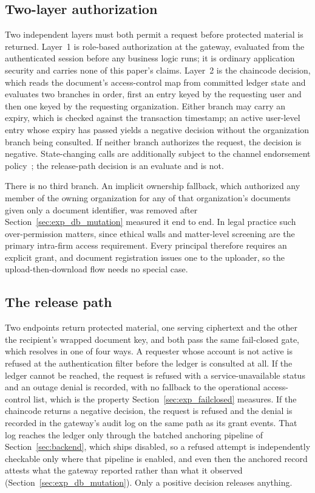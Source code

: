 \documentclass[preprint,12pt]{elsarticle}
\begin{document}
\subsection{Two-layer authorization}
\label{sec:twolayer}

Two independent layers must both permit a request before protected material
is returned. Layer~1 is role-based authorization at the gateway, evaluated from
the authenticated session before any business logic runs; it is ordinary
application security and carries none of this paper's claims. Layer~2 is the
chaincode decision, which reads the document's access-control map from
committed ledger state and evaluates two branches in order, first an entry
keyed by the requesting user and then one keyed by the requesting organization.
Either branch may carry an expiry, which is checked against the transaction
timestamp; an active user-level entry whose expiry has passed yields a
negative decision without the organization branch being consulted. If neither
branch authorizes the request, the decision is negative. State-changing calls are additionally
subject to the channel endorsement policy~\cite{fabricEndorsementDoc}; the
release-path decision is an evaluate and is not.

There is no third branch. An implicit ownership fallback, which authorized
any member of the owning organization for any of that organization's documents
given only a document identifier, was removed after
Section~\ref{sec:exp_db_mutation} measured it end to end. In legal practice
such over-permission matters, since ethical walls and matter-level screening
are the primary intra-firm access requirement. Every
principal therefore requires an explicit grant, and document registration
issues one to the uploader, so the upload-then-download flow needs no special
case.

\subsection{The release path}
\label{sec:releasepath}

Two endpoints return protected material, one serving ciphertext and the
other the recipient's wrapped document key, and both pass the same fail-closed gate,
which resolves in one of four ways. A requester whose account is not active is
refused at the authentication filter before the ledger is consulted at all. If the ledger cannot be
reached, the request is refused with a service-unavailable status and an outage
denial is recorded, with no fallback to the operational access-control list,
which is the property Section~\ref{sec:exp_failclosed} measures. If the
chaincode returns a negative decision, the request is refused and the denial is
recorded in the gateway's audit log on the same path as its grant events. That
log reaches the ledger only through the batched anchoring pipeline of
Section~\ref{sec:backend}, which ships disabled, so a refused attempt is
independently checkable only where that pipeline is enabled, and even then the
anchored record attests what the gateway reported rather than what it observed
(Section~\ref{sec:exp_db_mutation}). Only a positive decision releases
anything.
\end{document}
